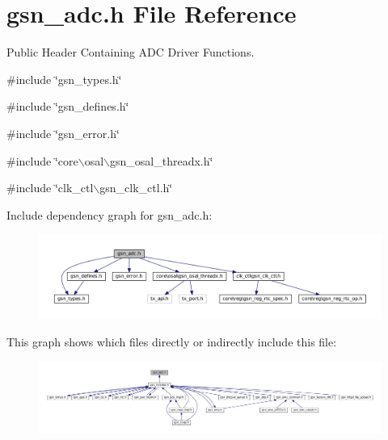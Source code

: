 \hypertarget{a00474}{
\section{gsn\_\-adc.h File Reference}
\label{a00474}
}


Public Header Containing ADC Driver Functions.  


{\ttfamily \#include \char`\"{}gsn\_\-types.h\char`\"{}}\par
{\ttfamily \#include \char`\"{}gsn\_\-defines.h\char`\"{}}\par
{\ttfamily \#include \char`\"{}gsn\_\-error.h\char`\"{}}\par
{\ttfamily \#include \char`\"{}core$\backslash$osal$\backslash$gsn\_\-osal\_\-threadx.h\char`\"{}}\par
{\ttfamily \#include \char`\"{}clk\_\-ctl$\backslash$gsn\_\-clk\_\-ctl.h\char`\"{}}\par
Include dependency graph for gsn\_\-adc.h:
\nopagebreak
\begin{figure}[H]
\begin{center}
\leavevmode
\includegraphics[width=400pt]{a00697}
\end{center}
\end{figure}
This graph shows which files directly or indirectly include this file:
\nopagebreak
\begin{figure}[H]
\begin{center}
\leavevmode
\includegraphics[width=400pt]{a00698}
\end{center}
\end{figure}
